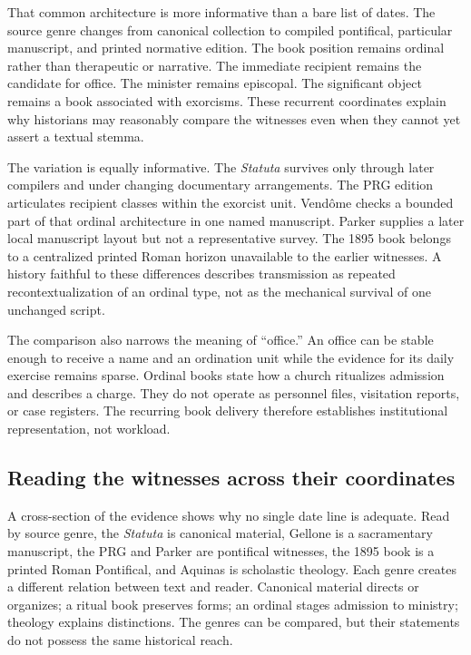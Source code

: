 That common architecture is more informative than a bare list of dates. The
source genre changes from canonical collection to compiled pontifical,
particular manuscript, and printed normative edition. The book position
remains ordinal rather than therapeutic or narrative. The immediate recipient
remains the candidate for office. The minister remains episcopal. The
significant object remains a book associated with exorcisms. These recurrent
coordinates explain why historians may reasonably compare the witnesses even
when they cannot yet assert a textual stemma.

The variation is equally informative. The \emph{Statuta} survives only through
later compilers and under changing documentary arrangements. The PRG edition
articulates recipient classes within the exorcist unit. Vendôme checks a
bounded part of that ordinal architecture in one named manuscript. Parker
supplies a later local manuscript layout but not a representative survey. The
1895 book belongs to a centralized printed Roman horizon unavailable to the
earlier witnesses. A history faithful to these differences describes
transmission as repeated recontextualization of an ordinal type, not as the
mechanical survival of one unchanged script.

The comparison also narrows the meaning of ``office.'' An office can be
stable enough to receive a name and an ordination unit while the evidence for
its daily exercise remains sparse. Ordinal books state how a church
ritualizes admission and describes a charge. They do not operate as personnel
files, visitation reports, or case registers. The recurring book delivery
therefore establishes institutional representation, not workload.

\subsection{Reading the witnesses across their coordinates}

A cross-section of the evidence shows why no single date line is adequate.
Read by source genre, the \emph{Statuta} is canonical material, Gellone is a
sacramentary manuscript, the PRG and Parker are pontifical witnesses, the
1895 book is a printed Roman Pontifical, and Aquinas is scholastic theology.
Each genre creates a different relation between text and reader. Canonical
material directs or organizes; a ritual book preserves forms; an ordinal
stages admission to ministry; theology explains distinctions. The genres can
be compared, but their statements do not possess the same historical reach.

